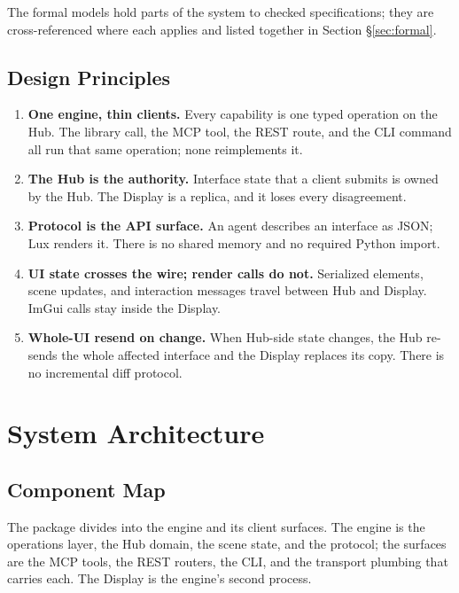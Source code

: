 \documentclass[a4paper,10pt]{article}
\begin{document}
The formal models hold parts of the system to checked specifications;
they are cross-referenced where each applies and listed together in
Section \S\ref{sec:formal}.

\subsection{Design Principles}

\begin{enumerate}[label=\textbf{P\arabic*}.]
  \item \textbf{One engine, thin clients.}  Every capability is one typed
    operation on the Hub.  The library call, the MCP tool, the REST route,
    and the CLI command all run that same operation; none reimplements it.
  \item \textbf{The Hub is the authority.}  Interface state that a client
    submits is owned by the Hub.  The Display is a replica, and it loses
    every disagreement.
  \item \textbf{Protocol is the API surface.}  An agent describes an
    interface as JSON; Lux renders it.  There is no shared memory and no
    required Python import.
  \item \textbf{UI state crosses the wire; render calls do not.}
    Serialized elements, scene updates, and interaction messages travel
    between Hub and Display.  ImGui calls stay inside the Display.
  \item \textbf{Whole-UI resend on change.}  When Hub-side state changes,
    the Hub re-sends the whole affected interface and the Display replaces
    its copy.  There is no incremental diff protocol.
\end{enumerate}

\section{System Architecture}

\subsection{Component Map}

The package divides into the engine and its client surfaces.  The engine
is the operations layer, the Hub domain, the scene state, and the
protocol; the surfaces are the MCP tools, the REST routers, the CLI, and
the transport plumbing that carries each.  The Display is the engine's
second process.
\end{document}
